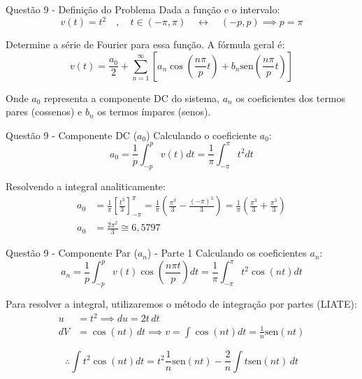 \documentclass[8pt,aspectratio = 169]{beamer}
\begin{document}
\begin{frame}{Questão 9 - Definição do Problema}
    Dada a função e o intervalo:
    \begin{equation*}
        v(t) = t^2 \quad , \quad t \in (-\pi, \pi) \quad \leftrightarrow \quad (-p, p) \implies p = \pi
    \end{equation*}
    
    Determine a série de Fourier para essa função. A fórmula geral é:
    \begin{equation*}
        v(t) = \frac{a_0}{2} + \sum_{n=1}^{\infty} \left[ a_n \cos\left(\frac{n\pi}{p} t\right) + b_n \text{sen}\left(\frac{n\pi}{p} t\right) \right]
    \end{equation*}
    
    Onde $a_0$ representa a componente DC do sistema, $a_n$ os coeficientes dos termos pares (cossenos) e $b_n$ os termos ímpares (senos).
\end{frame}

\begin{frame}{Questão 9 - Componente DC ($a_0$)}
    Calculando o coeficiente $a_0$:
    \begin{equation*}
        a_0 = \frac{1}{p} \int_{-p}^{p} v(t) dt = \frac{1}{\pi} \int_{-\pi}^{\pi} t^2 dt
    \end{equation*}
    
    Resolvendo a integral analiticamente:
    \begin{align*}
        a_0 &= \frac{1}{\pi} \left[ \frac{t^3}{3} \right]_{-\pi}^{\pi} = \frac{1}{\pi} \left( \frac{\pi^3}{3} - \frac{(-\pi)^3}{3} \right) = \frac{1}{\pi} \left( \frac{\pi^3}{3} + \frac{\pi^3}{3} \right) \\[10pt]
        a_0 &= \frac{2\pi^2}{3} \cong 6,5797
    \end{align*}
\end{frame}

\begin{frame}{Questão 9 - Componente Par ($a_n$) - Parte 1}
    Calculando os coeficientes $a_n$:
    \begin{equation*}
        a_n = \frac{1}{p} \int_{-p}^{p} v(t) \cos\left(\frac{n\pi t}{p}\right) dt = \frac{1}{\pi} \int_{-\pi}^{\pi} t^2 \cos(nt) dt 
    \end{equation*}
    
    Para resolver a integral, utilizaremos o método de integração por partes (LIATE):
    \begin{align*}
        u &= t^2 \implies du = 2t \, dt \\
        dV &= \cos(nt) \, dt \implies v = \int \cos(nt) dt = \frac{1}{n} \text{sen}(nt)
    \end{align*}
    
    \begin{equation*}
        \therefore \int t^2 \cos(nt) dt = t^2 \frac{1}{n} \text{sen}(nt) - \frac{2}{n} \int t \text{sen}(nt) \, dt
    \end{equation*}
\end{frame}
\end{document}
